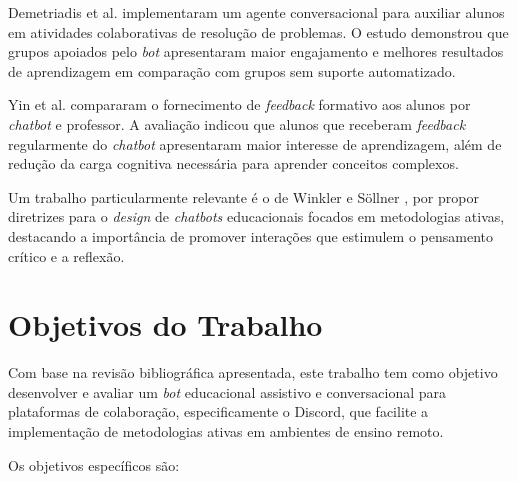 Demetriadis et al. \cite{demetriadis2018} implementaram um agente conversacional
para auxiliar alunos em atividades colaborativas de resolução de problemas. O
estudo demonstrou que grupos apoiados pelo \textit{bot} apresentaram maior
engajamento e melhores resultados de aprendizagem em comparação com grupos sem
suporte automatizado.

Yin et al. \cite{yin2024} compararam o fornecimento de \textit{feedback}
formativo aos alunos por \textit{chatbot} e professor. A avaliação indicou que
alunos que receberam \textit{feedback} regularmente do \textit{chatbot}
apresentaram maior interesse de aprendizagem, além de redução da carga cognitiva
necessária para aprender conceitos complexos.

Um trabalho particularmente relevante é o de Winkler e Söllner
\cite{winkler2018}, por propor diretrizes para o \textit{design} de
\textit{chatbots} educacionais focados em metodologias ativas, destacando a
importância de promover interações que estimulem o pensamento crítico e a
reflexão.

\section{Objetivos do Trabalho} \label{sec:objetivos}

Com base na revisão bibliográfica apresentada, este trabalho tem como objetivo
desenvolver e avaliar um \textit{bot} educacional assistivo e conversacional
para plataformas de colaboração, especificamente o Discord, que facilite a
implementação de metodologias ativas em ambientes de ensino remoto.

Os objetivos específicos são:

